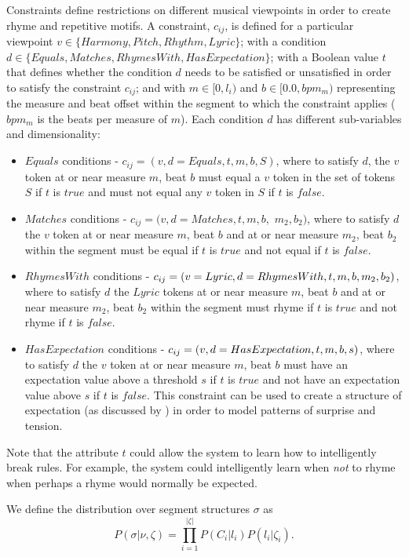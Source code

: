 \documentclass[phd,electronic,oneside,twosidetoc,letterpaper,chaptercenter,parttop,lol,lof,lot]{byumsphd}
\begin{document}
Constraints define restrictions on different musical viewpoints in order to create rhyme and repetitive motifs. A constraint, $c_{ij}$, is defined for a particular viewpoint $v\in\{Harmony, Pitch, Rhythm, Lyric\}$; with a condition $d\in\{Equals, Matches, RhymesWith, HasExpectation\}$; with a Boolean value $t$ that defines whether the condition $d$ needs to be satisfied or unsatisfied in order to satisfy the constraint $c_{ij}$; and with $m\in[0,l_i)$ and $b\in[0.0,bpm_m)$ representing the measure and beat offset within the segment to which the constraint applies ($bpm_m$ is the beats per measure of $m$). Each condition $d$ has different sub-variables and dimensionality:

\begin{itemize}
\item $Equals$ conditions - $c_{ij} = (v,d=Equals,t,m,b,S)$, where to satisfy $d$, the $v$ token at or near measure $m$, beat $b$ must equal a $v$ token in the set of tokens $S$ if $t$ is $true$ and must not equal any $v$ token in $S$ if $t$ is $false$.
\item $Matches$ conditions - $c_{ij} = (v,d=Matches,t,m,b,$ $m_2,b_2)$, where to satisfy $d$ the $v$ token at or near measure $m$, beat $b$ and at or near measure $m_2$, beat $b_2$ within the segment must be equal if $t$ is $true$ and not equal if $t$ is $false$.
\item $RhymesWith$ conditions - $c_{ij} = (v=Lyric,d=Rhy\-mes\-With,t,m,b,m_2,b_2)$, where to satisfy $d$ the $Lyric$ tokens at or near measure $m$, beat $b$ and at or near measure $m_2$, beat $b_2$ within the segment must rhyme if $t$ is $true$ and not rhyme if $t$ is $false$.
\item $HasExpectation$ conditions - $c_{ij} = (v,d=HasEx\-pectation,t,m,b,s)$, where to satisfy $d$ the $v$ token at or near measure $m$, beat $b$ must have an expectation value above a threshold $s$ if $t$ is $true$ and not have an expectation value above $s$ if $t$ is $false$. This constraint can be used to create a structure of expectation (as discussed by \citeauthor{meyer2008emotion} \cite{meyer2008emotion}) in order to model patterns of surprise and tension.
\end{itemize}

Note that the attribute $t$ could allow the system to learn how to intelligently break rules. For example, the system could intelligently learn when \emph{not} to rhyme when perhaps a rhyme would normally be expected.

We define the distribution over segment structures $\sigma$ as
\[ P(\sigma|\nu,\zeta) =  \prod_{i=1}^{|\zeta|} P(C_i | l_i) P(l_i|\zeta_i). \]
\end{document}

